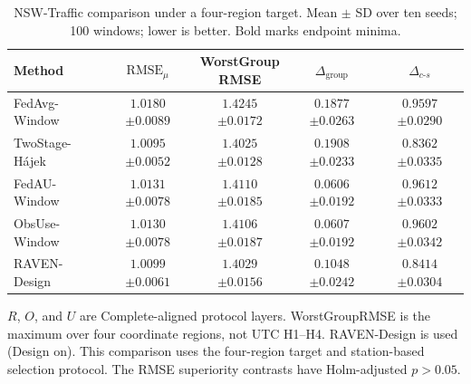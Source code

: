 \begin{table}[!htbp]
\centering
\caption{NSW-Traffic comparison under a four-region target.
Mean $\pm$ SD over ten seeds; 100 windows; lower is better.
Bold marks endpoint minima.}
\label{tab:traffic_four_region}
\footnotesize
\setlength{\tabcolsep}{2.5pt}
\begin{tabular}{@{}lcccc@{}}
\toprule
Method & $\mathrm{RMSE}_{\mu}$ & \shortstack{WorstGroup\\RMSE} &
$\Delta_{\mathrm{group}}$ & $\Delta_{c\text{-}s}$\\
\midrule
FedAvg-Window & \shortstack{$1.0180$\\$\pm0.0089$} & \shortstack{$1.4245$\\$\pm0.0172$} & \shortstack{$0.1877$\\$\pm0.0263$} & \shortstack{$0.9597$\\$\pm0.0290$}\\
TwoStage-H\'ajek & \shortstack{$\mathbf{1.0095}$\\$\pm0.0052$} & \shortstack{$\mathbf{1.4025}$\\$\pm0.0128$} & \shortstack{$0.1908$\\$\pm0.0233$} & \shortstack{$\mathbf{0.8362}$\\$\pm0.0335$}\\
FedAU-Window & \shortstack{$1.0131$\\$\pm0.0078$} & \shortstack{$1.4110$\\$\pm0.0185$} & \shortstack{$\mathbf{0.0606}$\\$\pm0.0192$} & \shortstack{$0.9612$\\$\pm0.0333$}\\
ObsUse-Window & \shortstack{$1.0130$\\$\pm0.0078$} & \shortstack{$1.4106$\\$\pm0.0187$} & \shortstack{$0.0607$\\$\pm0.0192$} & \shortstack{$0.9602$\\$\pm0.0342$}\\
RAVEN-Design & \shortstack{$1.0099$\\$\pm0.0061$} & \shortstack{$1.4029$\\$\pm0.0156$} & \shortstack{$0.1048$\\$\pm0.0242$} & \shortstack{$0.8414$\\$\pm0.0304$}\\
\bottomrule
\end{tabular}

\begin{minipage}{\columnwidth}
\raggedright\footnotesize
$R$, $O$, and $U$ are Complete-aligned protocol layers.
WorstGroupRMSE is the maximum over four coordinate regions, not UTC
H1--H4.  RAVEN-Design is used (Design on).
This comparison uses the four-region target and station-based selection
protocol.  The RMSE superiority contrasts have Holm-adjusted $p>0.05$.
\end{minipage}
\end{table}

